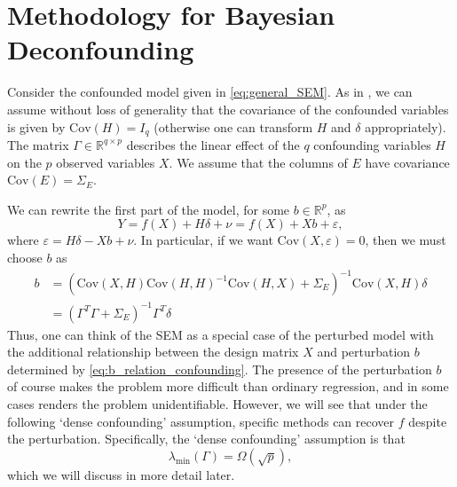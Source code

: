 \documentclass[11pt]{article}
\newcommand{\eps}{\varepsilon}
\newcommand{\R}{\mathbb{R}}
\newcommand{\cov}{\textrm{Cov}}
\begin{document}
\section{Methodology for Bayesian Deconfounding}\label{sect:methodology}
Consider the confounded model given in \eqref{eq:general_SEM}. As in \cite{CBM2020}, we can assume without loss of generality that the covariance of the confounded variables is given by $\cov(H) = I_q$ (otherwise one can transform $H$ and $\delta$ appropriately). The matrix $\Gamma \in \R^{q \times p}$ describes the linear effect of the $q$ confounding variables $H$ on  the $p$ observed variables $X$. We assume that the columns of $E$ have covariance $\cov(E) = \Sigma_E$.

We can rewrite the first part of the model, for some $b \in \R^p$, as
\begin{equation}\label{eq:likelihood}
Y = f(X) + H\delta + \nu = f(X) + Xb + \eps,	
\end{equation}
where $\eps = H\delta - Xb + \nu$. In particular, if we want $\cov(X, \eps) = 0$, then we must choose $b$ as
\begin{align}
b &= (\cov(X, H) \cov(H, H)^{-1} \cov(H, X) + \Sigma_E)^{-1}\cov(X, H) \delta	\nonumber \\
&= (\Gamma^T\Gamma + \Sigma_E)^{-1} \Gamma^T \delta \label{eq:b_relation_confounding}
\end{align}
Thus, one can think of the SEM as a special case of the perturbed model with the additional relationship between the design matrix $X$ and perturbation $b$ determined by \eqref{eq:b_relation_confounding}.
 The presence of the perturbation $b$ of course makes the problem more difficult than ordinary regression, and in some cases renders the problem unidentifiable. However, we will see that under the following `dense confounding' assumption, specific methods can recover $f$ despite the perturbation. Specifically, the `dense confounding' assumption is that
\begin{equation}
\lambda_{\min}(\Gamma) = \Omega(\sqrt{p}),	\label{ass:dense_confounding}
\end{equation}
which we will discuss in more detail later.
\end{document}
